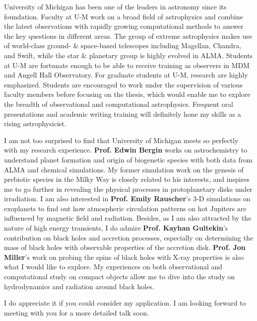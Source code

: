 \documentclass[11pt, a4paper]{awesome-cv} %
\begin{document}
\makecvheader %



\begin{cvletter}





University of Michigan has been one of the leaders in astronomy since its foundation. Faculty at U-M work on a broad field of astrophysics and combine the latest observations with rapidly growing computational methods to answer the key questions in different areas. The group of extreme astrophysics makes use of world-class ground- \& space-based telescopes including Magellan, Chandra, and Swift, while the star \& planetary group is highly evolved in ALMA. Students at U-M are fortunate enough to be able to receive training as observers in MDM and Angell Hall Observatory. For graduate students at U-M, research are highly emphasized. Students are encouraged to work under the supervision of various faculty members before focusing on the thesis, which would enable me to explore the breadth of observational and computational astrophysics. Frequent oral presentations and academic writing training will definitely hone my skills as a rising astrophysicist.

I am not too surprised to find that University of Michigan meets so perfectly with my research experience. \textbf{Prof. Edwin Bergin} works on astrochemistry to understand planet formation and origin of biogenetic species with both data from ALMA and chemical simulations. My former simulation work on the genesis of prebiotic species in the Milky Way is closely related to his interests, and inspires me to go further in revealing the physical processes in protoplanetary disks under irradiation. I am also interested in \textbf{Prof. Emily Rauscher}’s 3-D simulations on exoplanets to find out how atmospheric circulation patterns on hot Jupiters are influenced by magnetic field and radiation. Besides, as I am also attracted by the nature of high energy transients, I do admire \textbf{Prof. Kayhan Gultekin}’s contribution on black holes and accretion processes, especially on determining the mass of black holes with observable properties of the accretion disk. \textbf{Prof. Jon Miller}’s work on probing the spins of black holes with X-ray properties is also what I would like to explore. My experiences on both observational and computational study on compact objects allow me to dive into the study on hydrodynamics and radiation around black holes.

I do appreciate it if you could consider my application. I am looking forward to meeting with you for a more detailed talk soon.

\end{cvletter}


\end{document}
